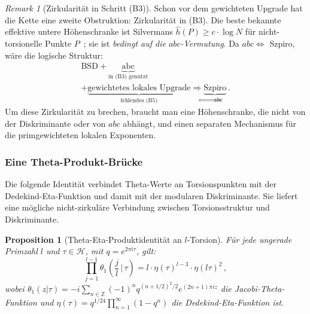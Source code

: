 \documentclass[aps,prd,twocolumn,superscriptaddress,nofootinbib,floatfix]{revtex4-2}
\newtheorem{proposition}[theorem]{Proposition}
\theoremstyle{definition}
\theoremstyle{remark}
\newtheorem{remark}[theorem]{Remark}
\begin{document}
\begin{remark}[Zirkularität in Schritt (B3)]
\label{rem:szpiro_circularity}
Schon vor dem gewichteten Upgrade hat die Kette eine zweite Obstruktion: Zirkularität in (B3). Die beste bekannte effektive untere Höhenschranke ist Silvermans $\hat{h}(P)\geq c\cdot\log N$ für nicht-torsionelle Punkte $P$~\cite{Silverman2009}; sie ist \textit{bedingt auf die $abc$-Vermutung}. Da $abc\Leftrightarrow$ Szpiro, wäre die logische Struktur:
\[
\begin{gathered}
\text{BSD}+\underbrace{\text{abc}}_{\text{in (B3) genutzt}}\\
+\underbrace{\text{gewichtetes lokales Upgrade}}_{\text{fehlendes (B5)}}
\Longrightarrow
\underbrace{\text{Szpiro}}_{\Leftrightarrow\,\text{abc}}\,.
\end{gathered}
\]
Um diese Zirkularität zu brechen, braucht man eine Höhenschranke, die nicht von der Diskriminante oder von $abc$ abhängt, und einen separaten Mechanismus für die primgewichteten lokalen Exponenten.
\end{remark}

\subsubsection{Eine Theta-Produkt-Brücke}

Die folgende Identität verbindet Theta-Werte an Torsionspunkten mit der Dedekind-Eta-Funktion und damit mit der modularen Diskriminante. Sie liefert eine mögliche nicht-zirkuläre Verbindung zwischen Torsionsstruktur und Diskriminante.


\begin{proposition}[Theta-Eta-Produktidentität an $l$-Torsion]
\label{prop:theta_eta}
Für jede ungerade Primzahl $l$ und $\tau\in\mathcal{H}$, mit $q=e^{2\pi i\tau}$, gilt:
\begin{equation}
\prod_{j=1}^{l-1}\theta_1\!\left(\frac{j}{l}\,\bigg|\,\tau\right)
= l\cdot\eta(\tau)^{l-3}\cdot\eta(l\tau)^2\,,
\label{eq:theta_eta_identity}
\end{equation}
wobei $\theta_1(z|\tau)=-i\sum_{n\in\mathbb{Z}}(-1)^nq^{(n+1/2)^2/2}e^{(2n+1)\pi iz}$ die Jacobi-Theta-Funktion und $\eta(\tau)=q^{1/24}\prod_{n=1}^{\infty}(1-q^n)$ die Dedekind-Eta-Funktion ist.
\end{proposition}
\end{document}
